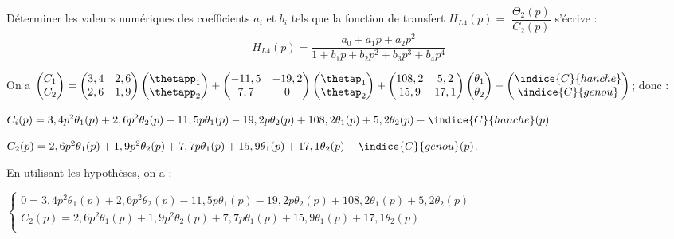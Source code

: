 \begin{question}
\label{2023_ccs_psi_q_12}
 Déterminer les valeurs numériques des coefficients $a_{i}$ et $b_{i}$ tels que la fonction de transfert $H_{L 4}(p)=$ $\dfrac{\Theta_{2}(p)}{C_{2}(p)}$ s'écrive :
$$
H_{L 4}(p)=\dfrac{a_{0}+a_{1} p+a_{2} p^{2}}{1+b_{1} p+b_{2} p^{2}+b_{3} p^{3}+b_{4} p^{4}}
$$
\end{question}
\ifprof
\begin{corrige}

On a $
\begin{pmatrix}
C_1 \\
C_2
\end{pmatrix}
=\begin{pmatrix}
3,4 & 2,6 \\
2,6 & 1,9
\end{pmatrix} \begin{pmatrix}
\thetapp_1 \\
\thetapp_2
\end{pmatrix}
+
\begin{pmatrix}
-11,5 & -19,2 \\
7,7 & 0
\end{pmatrix} \begin{pmatrix}
\thetap_1 \\
\thetap_2
\end{pmatrix}
+
\begin{pmatrix}
108,2 & 5,2 \\
15,9 & 17,1
\end{pmatrix} 
\begin{pmatrix}
\theta_1 \\
\theta_2
\end{pmatrix}-
\begin{pmatrix}
\indice{C}{hanche} \\
\indice{C}{genou}
\end{pmatrix}
$; donc : 

$C_i(p) = 3,4 p^2 \theta_1(p) + 2,6p^2\theta_2(p) - 11,5 p\theta_1(p) - 19,2p\theta_2(p) + 108,2\theta_1(p) + 5,2\theta_2(p) - \indice{C}{hanche}(p)$

$C_2(p) = 2,6 p^2 \theta_1(p) + 1,9 p^2\theta_2(p) + 7,7 p\theta_1(p) + 15,9\theta_1(p) + 17,1\theta_2(p) - \indice{C}{genou}(p)$.

En utilisant les hypothèses, on a :

$\left\{
\begin{array}{l} 
0= 3,4 p^2 \theta_1(p) + 2,6p^2\theta_2(p) - 11,5 p\theta_1(p) - 19,2p\theta_2(p) + 108,2\theta_1(p) + 5,2\theta_2(p) \\
C_2(p) = 2,6 p^2 \theta_1(p) + 1,9 p^2\theta_2(p) + 7,7 p\theta_1(p) + 15,9\theta_1(p) + 17,1\theta_2(p) \\
\end{array}
\right.$


\end{corrige}

